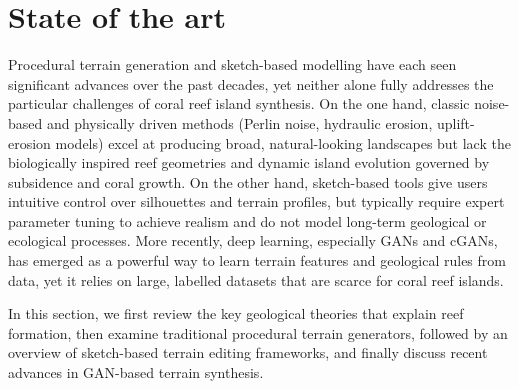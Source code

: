 



\section{State of the art}
\label{sec:coral-island-SotA}

Procedural terrain generation and sketch-based modelling have each seen significant advances over the past decades, yet neither alone fully addresses the particular challenges of coral reef island synthesis. On the one hand, classic noise-based and physically driven methods (Perlin noise, hydraulic erosion, uplift-erosion models) excel at producing broad, natural-looking landscapes but lack the biologically inspired reef geometries and dynamic island evolution governed by subsidence and coral growth. On the other hand, sketch-based tools give users intuitive control over silhouettes and terrain profiles, but typically require expert parameter tuning to achieve realism and do not model long-term geological or ecological processes. More recently, deep learning, especially GANs and cGANs, has emerged as a powerful way to learn terrain features and geological rules from data, yet it relies on large, labelled datasets that are scarce for coral reef islands. 

In this section, we first review the key geological theories that explain reef formation, then examine traditional procedural terrain generators, followed by an overview of sketch-based terrain editing frameworks, and finally discuss recent advances in GAN-based terrain synthesis.

